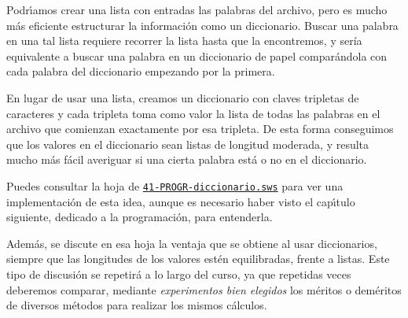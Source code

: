 Podr\'{\i}amos crear una lista con entradas las palabras del archivo, pero es
mucho m\'as eficiente estructurar la informaci\'on como un diccionario.  Buscar
una palabra en una tal lista requiere recorrer la lista hasta que la
encontremos, y ser\'ia equivalente a buscar una palabra en un diccionario de
papel compar\'andola con cada palabra del diccionario empezando por la primera. 



En lugar de usar una lista, 
creamos un diccionario con claves tripletas de caracteres y cada tripleta toma
como valor la lista de todas las palabras en el archivo que comienzan
exactamente por esa tripleta.  De esta forma conseguimos que los valores en el
diccionario sean listas de longitud moderada, y resulta mucho m\'as f\'acil 
averiguar si una cierta palabra est\'a o no en el diccionario. 

\label{diccionario}
Puedes consultar la hoja de {\sage}
\href{http://sage.mat.uam.es:8888/home/pub/4/}{\tt 41-PROGR-diccionario.sws} para ver una implementaci\'on de esta idea, 
aunque {\sc es necesario haber visto el cap\'{\i}tulo siguiente}, dedicado a la
programaci\'on, para entenderla. 

Adem\'as, se discute en esa hoja la ventaja que se obtiene al usar diccionarios,
siempre que las longitudes de los valores est\'en equilibradas, frente a listas.
Este tipo de discusi\'on se repetir\'a a lo largo del curso, ya que repetidas
veces deberemos comparar, mediante {\itshape experimentos bien elegidos} los
m\'eritos o dem\'eritos de diversos m\'etodos para realizar los mismos
c\'alculos.
                                                                    
